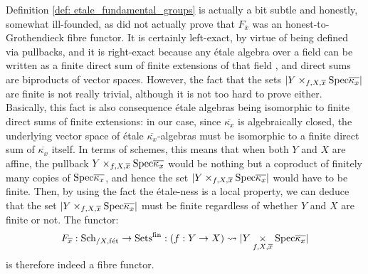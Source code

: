                 \begin{remark}
                    Definition \ref{def: etale_fundamental_groups} is actually a bit subtle and honestly, somewhat ill-founded, as did not actually prove that $F_{\overline{x}}$ was an honest-to-Grothendieck fibre functor. It is certainly left-exact, by virtue of being defined via pullbacks, and it is right-exact because any \'etale algebra over a field can be written as a finite direct sum of finite extensions of that field \cite[\href{https://stacks.math.columbia.edu/tag/00U3}{Tag 00U3}]{stacks}, and direct sums are biproducts of vector spaces. However, the fact that the sets $|Y \x_{f, X, \overline{x}} \Spec \overline{\kappa_x}|$ are finite is not really trivial, although it is not too hard to prove either. Basically, this fact is also consequence \'etale algebras being isomorphic to finite direct sums of finite extensions: in our case, since $\overline{\kappa_x}$ is algebraically closed, the underlying vector space of \'etale $\overline{\kappa_x}$-algebras must be isomorphic to a finite direct sum of $\overline{\kappa_x}$ itself. In terms of schemes, this means that when both $Y$ and $X$ are affine, the pullback $Y \x_{f, X, \overline{x}} \Spec \overline{\kappa_x}$ would be nothing but a coproduct of finitely many copies of $\mathrm{Spec} \overline{\kappa_x}$, and hence the set $|Y \x_{f, X, \overline{x}} \Spec \overline{\kappa_x}|$ would have to be finite. Then, by using the fact the \'etale-ness is a local property, we can deduce that the set $|Y \x_{f, X, \overline{x}} \Spec \overline{\kappa_x}|$ must be finite regardless of whether $Y$ and $X$ are finite or not. The functor:
                        $$F_{\overline{x}}: \Sch_{/X, \fet} \to \Sets^{\fin}: (f: Y \to X) \mapsto |Y \x_{f, X, \overline{x}} \Spec \overline{\kappa_x}|$$
                    is therefore indeed a fibre functor.
                \end{remark}
                

